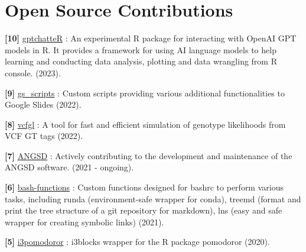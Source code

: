 \documentclass[letterpaper,10.5pt]{article}
\begin{document}

\section{Open Source Contributions}

\textbf{[10]} \hspace{0.42cm} \href{https://github.com/isinaltinkaya/gptchatteR}{gptchatteR} : An experimental R package for interacting with OpenAI GPT models in R. It provides a framework for using AI language models to help learning and conducting data analysis, plotting and data wrangling from R console. (2023). \\
\smallskip

\textbf{[9]} \hspace{0.42cm} \href{https://github.com/isinaltinkaya/google-slides_scripts}{gs\_scripts} : Custom scripts providing various additional functionalities to Google Slides (2022). \\
\smallskip

\textbf{[8]} \hspace{0.42cm} \href{https://github.com/isinaltinkaya/vcfgl}{vcfgl} : A tool for fast and efficient simulation of genotype likelihoods from VCF GT tags (2022). \\
\smallskip

\textbf{[7]} \hspace{0.42cm} \href{https://github.com/ANGSD/angsd}{ANGSD} : Actively contributing to the development and maintenance of the ANGSD software. (2021 - ongoing).\\
\smallskip

\textbf{[6]} \hspace{0.42cm} \href{https://github.com/isinaltinkaya/bash-functions}{bash-functions} : Custom functions designed for bashrc to perform various tasks, including runda (environment-safe wrapper for conda), treemd (format and print the tree structure of a git repository for markdown), lns (easy and safe wrapper for creating symbolic links) (2021).

\textbf{[5]} \hspace{0.42cm} \href{https://github.com/isinaltinkaya/i3pomodoror}{i3pomodoror} : i3blocks wrapper for the R package pomodoror (2020). \\
\smallskip
\end{document}
